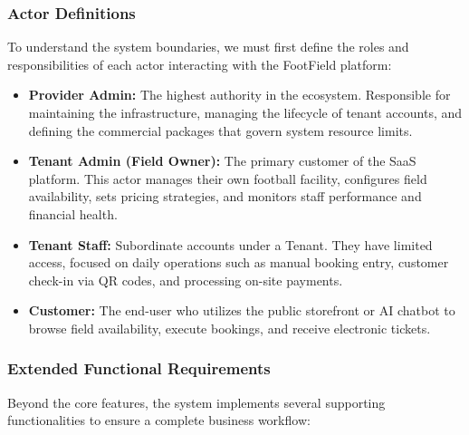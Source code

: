 \subsubsection{Actor Definitions}
To understand the system boundaries, we must first define the roles and responsibilities of each actor interacting with the FootField platform:

\begin{itemize}
    \item \textbf{Provider Admin:} The highest authority in the ecosystem. Responsible for maintaining the infrastructure, managing the lifecycle of tenant accounts, and defining the commercial packages that govern system resource limits.
    \item \textbf{Tenant Admin (Field Owner):} The primary customer of the SaaS platform. This actor manages their own football facility, configures field availability, sets pricing strategies, and monitors staff performance and financial health.
    \item \textbf{Tenant Staff:} Subordinate accounts under a Tenant. They have limited access, focused on daily operations such as manual booking entry, customer check-in via QR codes, and processing on-site payments.
    \item \textbf{Customer:} The end-user who utilizes the public storefront or AI chatbot to browse field availability, execute bookings, and receive electronic tickets.
\end{itemize}

\subsubsection{Extended Functional Requirements}
Beyond the core features, the system implements several supporting functionalities to ensure a complete business workflow:

